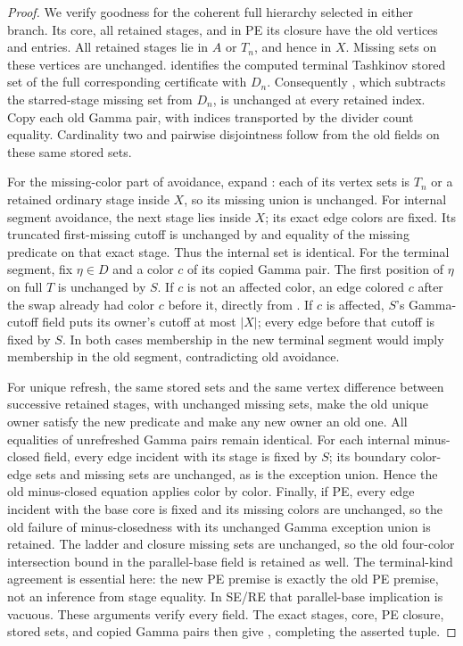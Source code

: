 \begin{proof}
We verify goodness for the coherent full hierarchy selected in either
branch. Its core, all retained stages, and in PE its closure have the old
vertices and entries. All retained stages lie in \(A\) or \(T_n\),
and hence in \(X\). Missing sets on these vertices are unchanged.
 identifies the computed terminal
Tashkinov stored set of the full corresponding certificate with \(D_n\).
Consequently , which subtracts the
starred-stage missing set from \(D_n\), is unchanged at every retained
index. Copy each old Gamma pair, with indices transported by the divider
count equality. Cardinality two and pairwise disjointness follow from
the old  fields on these same stored sets.

For the missing-color part of avoidance, expand
: each of its vertex sets is
\(T_n\) or a retained ordinary stage inside \(X\), so its missing
union is unchanged. For internal segment avoidance, the next stage
lies inside \(X\); its exact edge colors are fixed. Its truncated
first-missing cutoff is unchanged by
 and equality of
the missing predicate on that exact stage. Thus the internal
 set is identical.
For the terminal segment, fix \(\eta\in D\) and a color \(c\) of
its copied Gamma pair. The first position of \(\eta\) on full
\(T\) is unchanged by \(S\). If \(c\) is not an affected color,
an edge colored \(c\) after the swap already had color \(c\)
before it, directly from .
If \(c\) is affected, \(S\)'s Gamma-cutoff field puts its owner's
cutoff at most \(|X|\); every edge before that cutoff is fixed by
\(S\). In both cases membership in the new terminal segment would
imply membership in the old segment, contradicting old avoidance.

For unique refresh, the same stored sets and the same vertex difference
between successive retained stages, with unchanged missing sets, make
the old unique owner satisfy the new predicate and make any new owner
an old one. All equalities of unrefreshed Gamma pairs remain identical.
For each internal minus-closed field, every edge incident with its stage
is fixed by \(S\); its boundary color-edge sets and missing sets are
unchanged, as is the exception union. Hence the old minus-closed
equation applies color by color.
Finally, if PE, every edge incident with the base core is fixed and its
missing colors are unchanged, so the old failure of minus-closedness
with its unchanged Gamma exception union is retained. The ladder and
closure missing sets are unchanged, so the old four-color intersection
bound in the parallel-base field is retained as well. The terminal-kind
agreement is essential here: the new PE premise is exactly the old PE
premise, not an inference from stage equality.
In SE/RE that parallel-base implication is vacuous.
These arguments verify every  field.
The exact stages, core, PE closure, stored sets, and copied Gamma pairs
then give , completing the asserted tuple.
\end{proof}
